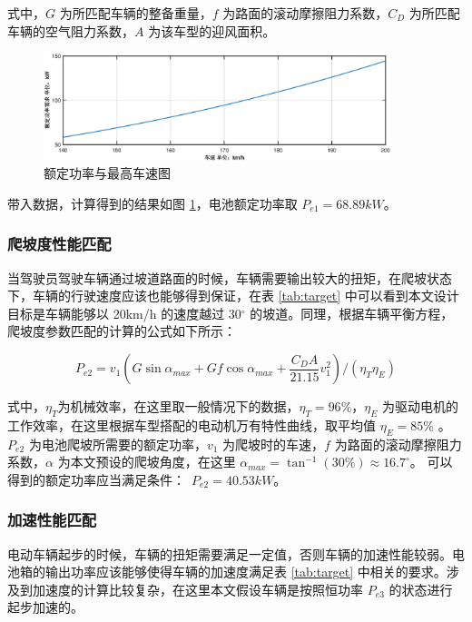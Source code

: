 式中，$G$ 为所匹配车辆的整备重量，$f$ 为路面的滚动摩擦阻力系数，$C_D$ 为所匹配车辆的空气阻力系数，$A$ 为该车型的迎风面积。

\begin{figure}
	\centering
	\includegraphics[width=0.9\textwidth]{figures/pe.eps}
	\caption{额定功率与最高车速图}\label{fig:pe}
\end{figure}

带入数据，计算得到的结果如图 \ref{fig:pe}，电池额定功率取 $P_{e1}=68.89 kW$。

\subsubsection{爬坡度性能匹配}

当驾驶员驾驶车辆通过坡道路面的时候，车辆需要输出较大的扭矩，在爬坡状态下，车辆的行驶速度应该也能够得到保证，在表 \ref{tab:target} 中可以看到本文设计目标是车辆能够以 20km/h 的速度越过 30$^\circ$ 的坡道。同理，根据车辆平衡方程，爬坡度参数匹配的计算的公式如下所示：

\begin{equation}
	P_{e2} = v_{1} (G\sin\alpha_{max}+Gf\cos\alpha_{max}+\frac{C_DA}{21.15}v_{1}^2)/(\eta_T\eta_E)
\end{equation}

式中，$\eta_T$为机械效率，在这里取一般情况下的数据，$\eta_T = 96\%$，$\eta_E$ 为驱动电机的工作效率，在这里根据车型搭配的电动机万有特性曲线，取平均值 $\eta_E = 85\%$ 。$P_{e2}$ 为电池爬坡所需要的额定功率，$v_{1}$ 为爬坡时的车速，$f$ 为路面的滚动摩擦阻力系数，$\alpha$ 为本文预设的爬坡角度，在这里 $\alpha_{max}=\tan^{-1}(30\%)\approx 16.7^\circ$。
可以得到的额定功率应当满足条件：\ $P_{e2}= 40.53 kW$。

\subsubsection{加速性能匹配}
电动车辆起步的时候，车辆的扭矩需要满足一定值，否则车辆的加速性能较弱。电池箱的输出功率应该能够使得车辆的加速度满足表 \ref{tab:target} 中相关的要求。涉及到加速度的计算比较复杂，在这里本文假设车辆是按照恒功率 $P_{e3}$ 的状态进行起步加速的。

